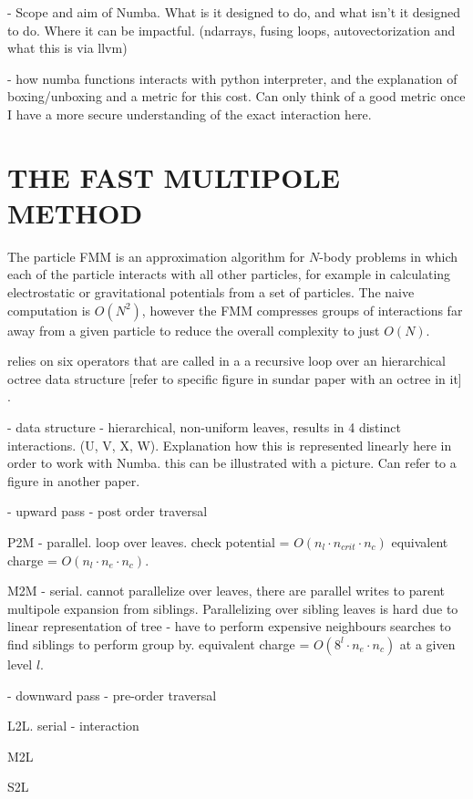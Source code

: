 \documentclass{IEEEcsmag}
\begin{document}
- Scope and aim of Numba. What is it designed to do, and what isn't it designed to do. Where it can be impactful. (ndarrays, fusing loops, autovectorization and what this is via llvm)

- how numba functions interacts with python interpreter, and the explanation of boxing/unboxing and a metric for this cost. Can only think of a good metric once I have a more secure understanding of the exact interaction here.


\section{THE FAST MULTIPOLE METHOD}

The particle FMM is an approximation algorithm for $N$-body problems in which each of the particle interacts with all other particles, for example in calculating electrostatic or gravitational potentials from a set of particles. The naive computation is $O(N^2)$, however the FMM compresses groups of interactions far away from a given particle to reduce the overall complexity to just $O(N)$.

relies on six operators that are called in a a recursive loop  over an hierarchical octree data structure [refer to specific figure in sundar paper with an octree in it] \cite{Sundar2007}.

- data structure - hierarchical, non-uniform leaves, results in 4 distinct interactions. (U, V, X, W). Explanation how this is represented linearly here in order to work with Numba.
this can be illustrated with a picture. Can refer to a figure in another paper.



- upward pass - post order traversal

P2M
- parallel. loop over leaves. check potential = $O(n_l \cdot n_{crit} \cdot n_c)$ equivalent charge = $O(n_l \cdot n_e \cdot  n_c)$.

M2M
- serial. cannot parallelize over leaves, there are parallel writes to parent multipole expansion from siblings. Parallelizing over sibling leaves is hard due to linear representation of tree - have to perform expensive neighbours searches to find siblings to perform group by. equivalent charge = $O(8^l \cdot n_e \cdot n_c)$ at a given level $l$.

- downward pass - pre-order traversal

L2L. serial - interaction

M2L

S2L
\end{document}
